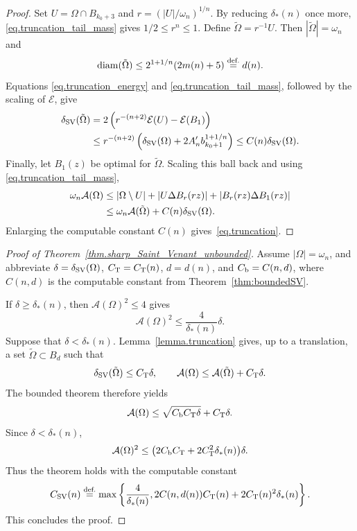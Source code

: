 \documentclass[11pt]{amsart}
\theoremstyle{plain}
\theoremstyle{definition}
\newcommand{\eqdef}{\overset{\text{def.}}{=}}
\newcommand\diam{\mathop{\rm diam}}
\begin{document}
\begin{proof}
  Set $U=\Omega\cap B_{k_0+3}$ and
$r=(|U|/\omega_n)^{1/n}$. By reducing $\delta_*(n)$ once more,
\eqref{eq.truncation_tail_mass} gives $1/2\le r^n\le1$. Define
$\tilde\Omega=r^{-1}U$. Then $|\tilde\Omega|=\omega_n$ and
\[
 \diam(\tilde\Omega)\le2^{1+1/n}(2m(n)+5)\eqdef d(n).
\]
Equations \eqref{eq.truncation_energy} and
\eqref{eq.truncation_tail_mass}, followed by the scaling of $\mathcal{E}$,
give
\begin{align*}
 \delta_{\rm SV}(\tilde\Omega)
 &=2\left(r^{-(n+2)}\mathcal{E}(U)-\mathcal{E}(B_1)\right)\\
 &\le r^{-(n+2)}
 \left(\delta_{\rm SV}(\Omega)+2A'_n b_{k_0+1}^{1+1/n}\right)
 \le C(n)\delta_{\rm SV}(\Omega).
\end{align*}
Finally, let $B_1(z)$ be optimal for $\tilde\Omega$. Scaling this ball back
and using \eqref{eq.truncation_tail_mass},
\begin{align*}
 \omega_n\mathcal A(\Omega)
 &\le|\Omega\setminus U|+|U\Delta B_r(rz)|
   +|B_r(rz)\Delta B_1(rz)|\\
 &\le\omega_n\mathcal A(\tilde\Omega)+C(n)\delta_{\rm SV}(\Omega).
\end{align*}
Enlarging the computable constant $C(n)$ gives~\eqref{eq.truncation}.
\end{proof}

\begin{proof}[Proof of Theorem~\ref{thm.sharp_Saint_Venant_unbounded}]
Assume $|\Omega|=\omega_n$, and abbreviate
$\delta=\delta_{\rm SV}(\Omega)$, $C_{\rm T}=C_{\rm T}(n)$,
$d=d(n)$, and $C_{\rm b}=C(n,d)$, where $C(n,d)$ is the computable constant
 from Theorem~\ref{thm:boundedSV}.


If $\delta\ge\delta_*(n)$, then $\mathcal A(\Omega)^2\le4$ gives
\[
 \mathcal A(\Omega)^2\le\frac{4}{\delta_*(n)}\delta.
\]
  Suppose that $\delta<\delta_*(n)$. Lemma~\ref{lemma.truncation} gives, up to
a translation, a set $\tilde\Omega\subset B_d$ such that
\[
 \delta_{\rm SV}(\tilde\Omega)\le C_{\rm T}\delta,
 \qquad
 \mathcal A(\Omega)\le\mathcal A(\tilde\Omega)+C_{\rm T}\delta.
\]
  The bounded theorem therefore yields
\[
 \mathcal A(\Omega)
 \le\sqrt{C_{\rm b}C_{\rm T}\delta}+C_{\rm T}\delta.
\]
Since $\delta<\delta_*(n)$,
\[
 \mathcal A(\Omega)^2
 \le\bigl(2C_{\rm b}C_{\rm T}
 +2C_{\rm T}^2\delta_*(n)\bigr)\delta.
\]
Thus the theorem holds with the computable constant
\begin{equation}\label{eq.global_CSV}
 C_{\rm SV}(n)
 \eqdef\max\left\{
 \frac{4}{\delta_*(n)},
 2C(n,d(n))C_{\rm T}(n)+2C_{\rm T}(n)^2\delta_*(n)
 \right\}.
\end{equation}
This concludes the proof.
\end{proof}
\end{document}
